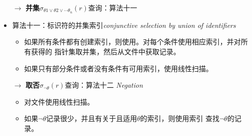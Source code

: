 \documentclass[b5paper, twoside]{article}
\let\oldtextbf\textbf
\renewcommand{\textbf}[1]{\textcolor{myblue}{\oldtextbf{#1}}}
\let\oldemph\emph
\renewcommand{\emph}[1]{\textcolor{mypink}{\oldemph{#1}}}
\begin{document}
\begin{itemize}
{	intersection of identifiers}
	\begin{itemize}
		\item 对每个条件使用相应的索引，并对所有获得的记录指针集合取交集。
		\item 如果某些条件没有合适索引，则在读到内存后再对他们进行该条件的测试。
	\end{itemize}
	\item[$\rightarrow$] \textbf{并集}$\sigma_{\theta1 \vee \theta2 \vee 
	\cdots \theta_n}(r)$查询：算法十一
	\item 算法十一：标识符的并集索引\hfill \emph{conjunctive selection by 
	union of identifiers}
	\begin{itemize}
		\item 如果所有条件都有创建索引，则使用。对每个条件使用相应索引，并对所有获得的
		指针集取并集，然后从文件中获取记录。
		\item 如果只有部分条件或者没有条件有可用索引，使用线性扫描。
	\end{itemize}
	\item[$\rightarrow$] 
	\textbf{取否}$\sigma_{\neg\theta}(r)$查询：算法十二\hfill 
	\emph{Negation}
	\begin{itemize}
		\item 对文件使用线性扫描。
		\item 如果$\neg\theta$记录很少，并且有关于且适用$\theta$的索引，则使用索引
		查找$\neg\theta$的记录。
	\end{itemize}
\end{itemize}
\end{document}

